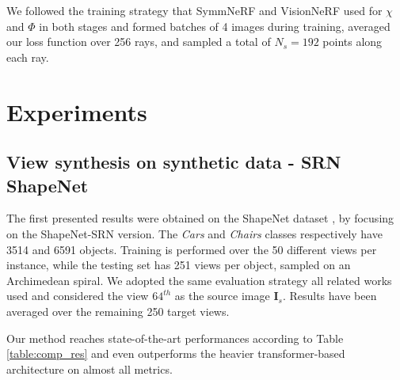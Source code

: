We followed the training strategy that SymmNeRF \citep{li2022symmnerf} and VisionNeRF \citep{lin2023vision} used for $\chi$ and $\Phi$ in both stages and formed batches of 4 images during training, averaged our loss function over 256 rays, and sampled a total of $N_{s}=192$ points along each ray.

\section{Experiments}
\label{subsec:epinerf/experiments}
\subsection{View synthesis on synthetic data - SRN ShapeNet}
The first presented results were obtained on the ShapeNet dataset \citep{chang2015shapenet}, by focusing on the ShapeNet-SRN \citep{sitzmann2019scene} version. The \textit{Cars} and \textit{Chairs} classes respectively have 3514 and 6591 objects. Training is performed over the 50 different views per instance, while the testing set has 251 views per object, sampled on an Archimedean spiral. We adopted the same evaluation strategy all related works used and considered the view $64^{th}$ as the source image $\textbf{I}_{s}$. Results have been  averaged over the remaining 250 target views. 

Our method reaches state-of-the-art performances according to Table \ref{table:comp_res} and even outperforms the heavier transformer-based architecture \citep{lin2023vision} on almost all metrics. 

